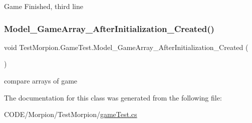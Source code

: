 Game Finished, third line 

\mbox{\label{class_test_morpion_1_1_game_test_a234cbecd9a2f80c6ed5654c88ed7cd38}} 
\subsubsection{\texorpdfstring{Model\+\_\+\+Game\+Array\+\_\+\+After\+Initialization\+\_\+\+Created()}{Model\_GameArray\_AfterInitialization\_Created()}}
{\footnotesize\ttfamily void Test\+Morpion.\+Game\+Test.\+Model\+\_\+\+Game\+Array\+\_\+\+After\+Initialization\+\_\+\+Created (\begin{DoxyParamCaption}{ }\end{DoxyParamCaption})}



compare arrays of game 



The documentation for this class was generated from the following file\+:\begin{DoxyCompactItemize}
\item 
C\+O\+D\+E/\+Morpion/\+Test\+Morpion/\hyperlink{game_test_8cs}{game\+Test.\+cs}\end{DoxyCompactItemize}
